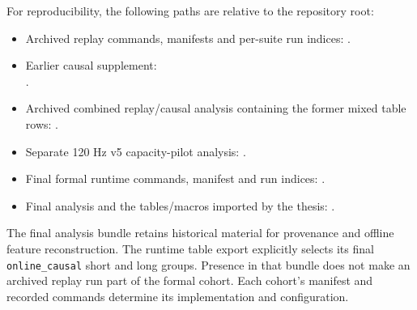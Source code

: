 \begin{samepage}
For reproducibility, the following paths are relative to the repository root:
\begin{itemize}[leftmargin=*]
    \item Archived replay commands, manifests and per-suite run indices:
    .
    \item Earlier causal supplement:\\
    .
    \item Archived combined replay/causal analysis containing the former
    mixed table rows: .
    \item Separate 120 Hz v5 capacity-pilot analysis:
    .
    \item Final formal runtime commands, manifest and run indices:
    .
    \item Final analysis and the tables/macros imported by the thesis:
    .
\end{itemize}
\end{samepage}
The final analysis bundle retains historical material for provenance and
offline feature reconstruction. The runtime table export explicitly selects
its final \texttt{online\_causal} short and long groups. Presence in that bundle
does not make an archived replay run part of the formal cohort. Each cohort's
manifest and recorded commands determine its implementation and configuration.
